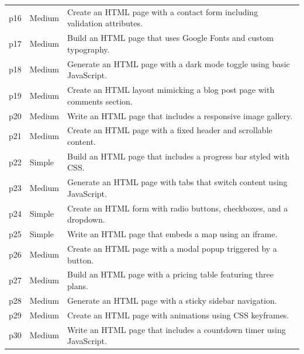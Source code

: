 \begin{longtable}{@{} l l p{13cm} @{}}
	p16         & Medium              & Create an HTML page with a contact form including validation attributes.                           \\
	p17         & Medium              & Build an HTML page that uses Google Fonts and custom typography.                                   \\
	p18         & Medium              & Generate an HTML page with a dark mode toggle using basic JavaScript.                              \\
	p19         & Medium              & Create an HTML layout mimicking a blog post page with comments section.                            \\
	p20         & Medium              & Write an HTML page that includes a responsive image gallery.                                       \\
	p21         & Medium              & Create an HTML page with a fixed header and scrollable content.                                    \\
	p22         & Simple              & Build an HTML page that includes a progress bar styled with CSS.                                   \\
	p23         & Medium              & Generate an HTML page with tabs that switch content using JavaScript.                              \\
	p24         & Simple              & Create an HTML form with radio buttons, checkboxes, and a dropdown.                                \\
	p25         & Simple              & Write an HTML page that embeds a map using an iframe.                                              \\
	p26         & Medium              & Create an HTML page with a modal popup triggered by a button.                                      \\
	p27         & Medium              & Build an HTML page with a pricing table featuring three plans.                                     \\
	p28         & Medium              & Generate an HTML page with a sticky sidebar navigation.                                            \\
	p29         & Medium              & Create an HTML page with animations using CSS keyframes.                                           \\
	p30         & Medium              & Write an HTML page that includes a countdown timer using JavaScript.                               \\

\end{longtable}
